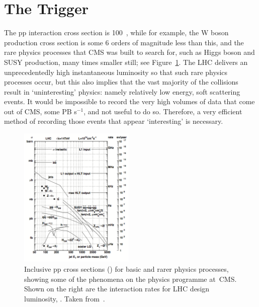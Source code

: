 

\newpage
\section{The Trigger} \label{sec:CMStrig}

The pp interaction cross section is 100~\mb, while for example, the W boson production cross section is some 6 orders of magnitude less than this, and the rare physics processes that \ac{CMS} was built to search for, such as Higgs boson and \ac{SUSY} production, many times smaller still; see Figure~\ref{fig:ppCrossSec}.
The \ac{LHC} delivers an unprecedentedly high instantaneous luminosity so that such rare physics processes occur, but this also implies that the vast majority of the collisions result in `uninteresting' physics: namely relatively low energy, soft scattering events.
It would be impossible to record the very high volumes of data that come out of \ac{CMS}, some PB s$^{-1}$, and not useful to do so.
Therefore, a very efficient method of recording those events that appear `interesting'
is necessary.%

\begin{figure}[htbp]
  \begin{center}
  \includegraphics[width=0.49\textwidth]{Figures/detector/ppCrossSections}
  \caption{Inclusive pp cross sections (\sigma) for basic and rarer physics processes, showing some of the phenomena on the physics programme at~\ac{CMS}. Shown on the right are the interaction rates for \ac{LHC} design luminosity, \designLumi. Taken from~\cite{Cittolin:578006}.
}
  \label{fig:ppCrossSec}
  \end{center}
\end{figure}

